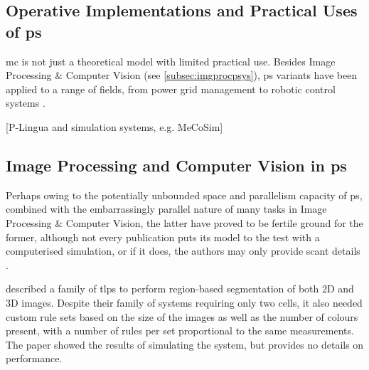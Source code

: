 \subsection{\label{sec:psystemsuses}Operative Implementations and Practical Uses of \texorpdfstring{\gls{ps}}{P systems}}
\Gls{mc} is not just a theoretical model with limited practical use.  Besides Image Processing \& Computer Vision (see \cref{subsec:imgprocpsys}), \gls{ps} variants have been applied to a range of fields, from power grid management to robotic control systems \cite{Zhang2017}.

[P-Lingua and simulation systems, e.g. MeCoSim]

\subsection{\label{subsec:imgprocpsys}Image Processing and Computer Vision in \texorpdfstring{\gls{ps}}{P systems}}

Perhaps owing to the potentially unbounded space and parallelism capacity of \gls{ps}, combined with the embarrassingly parallel nature of many tasks in Image Processing \& Computer Vision, the latter have proved to be fertile ground for the former, although not every publication puts its model to the test with a computerised simulation, or if it does, the authors may only provide scant details \cite{Diaz-Pernil2019}.

\citeauthor{Christinal2011} \cite{Christinal2011} described a family of \gls{tlps} to perform region-based segmentation of both 2D and 3D images.  Despite their family of systems requiring only two cells, it also needed custom rule sets based on the size of the images as well as the number of colours present, with a number of rules per set proportional to the same measurements.  The paper showed the results of simulating the system, but provides no details on performance.


